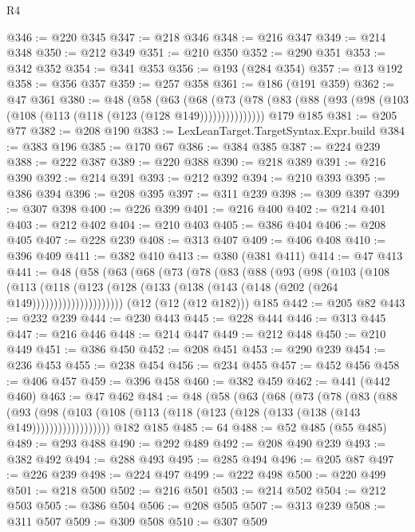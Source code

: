\begin{lexlean}{R4}
\begin{coremodule}
@346 := @220 @345
@347 := @218 @346
@348 := @216 @347
@349 := @214 @348
@350 := @212 @349
@351 := @210 @350
@352 := @290 @351
@353 := @342 @352
@354 := @341 @353
@356 := @193 (@284 @354)
@357 := @13 @192
@358 := @356 @357
@359 := @257 @358
@361 := @186 (@191 @359)
@362 := @47 @361
@380 := @48
    (@58
      (@63
        (@68 (@73 (@78 (@83 (@88 (@93 (@98 (@103 (@108 (@113 (@118 (@123 (@128 @149)))))))))))))))
    @179
    @185
@381 := @205 @77
@382 := @208 @190
@383 := LexLeanTarget.TargetSyntax.Expr.build
@384 := @383 @196
@385 := @170 @67
@386 := @384 @385
@387 := @224 @239
@388 := @222 @387
@389 := @220 @388
@390 := @218 @389
@391 := @216 @390
@392 := @214 @391
@393 := @212 @392
@394 := @210 @393
@395 := @386 @394
@396 := @208 @395
@397 := @311 @239
@398 := @309 @397
@399 := @307 @398
@400 := @226 @399
@401 := @216 @400
@402 := @214 @401
@403 := @212 @402
@404 := @210 @403
@405 := @386 @404
@406 := @208 @405
@407 := @228 @239
@408 := @313 @407
@409 := @406 @408
@410 := @396 @409
@411 := @382 @410
@413 := @380 (@381 @411)
@414 := @47 @413
@441 := @48
    (@58
      (@63
        (@68
          (@73
            (@78
              (@83
                (@88
                  (@93
                    (@98
                      (@103
                        (@108
                          (@113
                            (@118
                              (@123
                                (@128 (@133 (@138 (@143 (@148 (@202 (@264 @149)))))))))))))))))))))
    (@12 (@12 (@12 @182)))
    @185
@442 := @205 @82
@443 := @232 @239
@444 := @230 @443
@445 := @228 @444
@446 := @313 @445
@447 := @216 @446
@448 := @214 @447
@449 := @212 @448
@450 := @210 @449
@451 := @386 @450
@452 := @208 @451
@453 := @290 @239
@454 := @236 @453
@455 := @238 @454
@456 := @234 @455
@457 := @452 @456
@458 := @406 @457
@459 := @396 @458
@460 := @382 @459
@462 := @441 (@442 @460)
@463 := @47 @462
@484 := @48
    (@58
      (@63
        (@68
          (@73
            (@78
              (@83
                (@88
                  (@93
                    (@98
                      (@103 (@108 (@113 (@118 (@123 (@128 (@133 (@138 (@143 @149))))))))))))))))))
    @182
    @185
@485 := 64
@488 := @52 @485 (@55 @485)
@489 := @293 @488
@490 := @292 @489
@492 := @208 @490 @239
@493 := @382 @492
@494 := @288 @493
@495 := @285 @494
@496 := @205 @87
@497 := @226 @239
@498 := @224 @497
@499 := @222 @498
@500 := @220 @499
@501 := @218 @500
@502 := @216 @501
@503 := @214 @502
@504 := @212 @503
@505 := @386 @504
@506 := @208 @505
@507 := @313 @239
@508 := @311 @507
@509 := @309 @508
@510 := @307 @509

\end{coremodule}
\end{lexlean}
